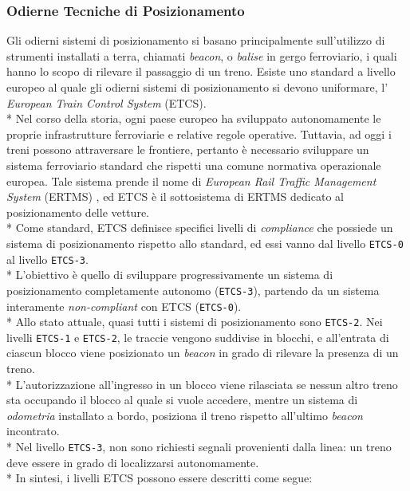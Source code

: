 \subsubsection{Odierne Tecniche di Posizionamento}
Gli odierni sistemi di posizionamento si basano principalmente sull'utilizzo di strumenti installati a terra, chiamati \emph{beacon}, o \emph{balise} in gergo ferroviario, i quali hanno lo scopo di rilevare il passaggio di un treno.\cite{tecnicheodierne}
Esiste uno standard a livello europeo al quale gli odierni sistemi di posizionamento si devono uniformare, l' \emph{European Train Control System} (ETCS).\\*
Nel corso della storia, ogni paese europeo ha sviluppato autonomamente le proprie infrastrutture ferroviarie e relative regole operative. Tuttavia, ad oggi i treni possono attraversare le frontiere, pertanto \`e necessario sviluppare un sistema ferroviario standard che rispetti una comune normativa operazionale europea. Tale sistema prende il nome di \emph{European Rail Traffic Management System} (ERTMS) \cite{ertms}, ed ETCS \`e il sottosistema di ERTMS dedicato al posizionamento delle vetture.\\*
Come standard, ETCS definisce specifici livelli di \emph{compliance} che possiede un sistema di posizionamento rispetto allo standard, ed essi vanno dal livello \texttt{ETCS-0} al livello \texttt{ETCS-3}. \cite{svolta}
\\*
L'obiettivo \`e quello di sviluppare progressivamente un sistema di posizionamento completamente autonomo (\texttt{ETCS-3}), partendo da un sistema interamente \emph{non-compliant} con ETCS (\texttt{ETCS-0}).
\\*
Allo stato attuale, quasi tutti i sistemi di posizionamento sono \texttt{ETCS-2}. Nei livelli \texttt{ETCS-1} e \texttt{ETCS-2}, le traccie vengono suddivise in blocchi, e all'entrata di ciascun blocco viene posizionato un \emph{beacon} in grado di rilevare la presenza di un treno.\\*
L'autorizzazione all'ingresso in un blocco viene rilasciata se nessun altro treno sta occupando il blocco al quale si vuole accedere, mentre un sistema di \emph{odometria} installato a bordo, posiziona il treno rispetto all'ultimo \emph{beacon} incontrato.\\*
Nel livello \texttt{ETCS-3}, non sono richiesti segnali provenienti dalla linea: un treno deve essere in grado di localizzarsi autonomamente. \cite{etcs3}\\*
In sintesi, i livelli ETCS possono essere descritti come segue:
